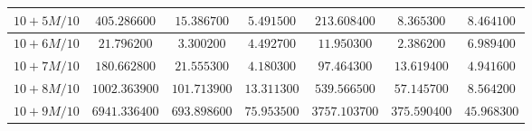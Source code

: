 \begin{landscape}
\begin{table}[]
\begin{tabular}{|c|c|c|c|c|c|c|}
$10 + 5M/10$ & $405.286600$                                                 & $15.386700$                                                  & $5.491500$                                                   & $213.608400$                                                       & $8.365300$                                                         & \multicolumn{1}{c|}{$8.464100$}                                                         \\ \hline
$10 + 6M/10$ & $21.796200$                                                  & $3.300200$                                                   & $4.492700$                                                   & $11.950300$                                                        & $2.386200$                                                         & \multicolumn{1}{c|}{$6.989400$}                                                         \\ \hline
$10 + 7M/10$ & $180.662800$                                                 & $21.555300$                                                  & $4.180300$                                                   & $97.464300$                                                        & $13.619400$                                                        & \multicolumn{1}{c|}{$4.941600$}                                                         \\ \hline
$10 + 8M/10$ & $1002.363900$                                                & $101.713900$                                                 & $13.311300$                                                  & $539.566500$                                                       & $57.145700$                                                        & \multicolumn{1}{c|}{$8.564200$}                                                         \\ \hline
$10 + 9M/10$ & $6941.336400$                                                & $693.898600$                                                 & $75.953500$                                                  & $3757.103700$                                                      & $375.590400$                                                       & $45.968300$                                                                             \\ \hline
\end{tabular}
\end{table}
\end{landscape}
